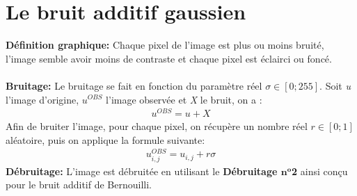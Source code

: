 \documentclass{article}
\begin{document}
	
	
		\newpage
		
		
	
		\section{Le bruit additif gaussien}
		\textbf{Définition graphique: }Chaque pixel de l'image est plus ou moins bruité, l'image semble avoir moins de contraste et chaque pixel est éclairci ou foncé.\\\\
		\textbf{Bruitage: }Le bruitage se fait en fonction du paramètre réel \begin{math}\sigma\in[0;255]\end{math}. Soit \emph{u} l'image d'origine, \begin{math}u^{OBS}\end{math} l'image observée et \emph{X} le bruit, on a :
		\begin{align*}
			u^{OBS} = u + X
		\end{align*}
		Afin de bruiter l'image, pour chaque pixel, on récupère un nombre réel \begin{math}r \in [0;1]\end{math} aléatoire, puis on applique la formule suivante:
		\begin{align*}
			u^{OBS}_{i,j} = u_{i,j} + r\sigma
		\end{align*}
		\textbf{Débruitage: }L'image est débruitée en utilisant le \textbf{Débruitage \begin{math}\textbf{n}^\textbf{o}\end{math}2} ainsi conçu pour le bruit additif de Bernouilli.\\\\
\end{document}
